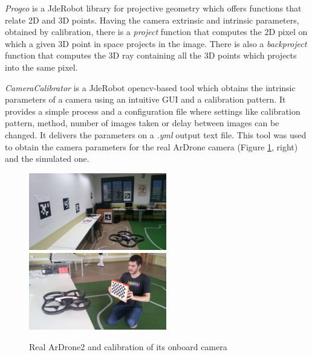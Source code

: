 \documentclass{styles/svproc}
\begin{document}
 \textit{Progeo} is a JdeRobot library for projective geometry which offers functions that relate 2D and 3D points. Having the camera extrinsic and intrinsic parameters, obtained by calibration, there is a \textit{project} function that computes the 2D pixel on which a given 3D point in space projects in the image. There is also a \textit{backproject} function that computes the 3D ray containing all the 3D points which projects into the same pixel. 

 \textit{CameraCalibrator} is a JdeRobot opencv-based tool which obtains the intrinsic parameters of a camera using an intuitive GUI and a calibration pattern. It provides a simple process and a configuration file where settings like calibration pattern, method, number of images taken or delay between images can be changed. It delivers the parameters on a \textit{.yml} output text file.
This tool was used to obtain the camera parameters for the real ArDrone camera (Figure \ref{fig:calibration}, right) and the simulated one.

	\begin{figure}[h]
		\begin{center}
                  {\includegraphics[width=6cm]{realnavigation.png}}
                  {\includegraphics[width=6cm]{calibration.jpg}}
		\end{center}
		\caption{Real ArDrone2 and calibration of its onboard camera}
                \label{fig:calibration}
	\end{figure}
        
\end{document}
